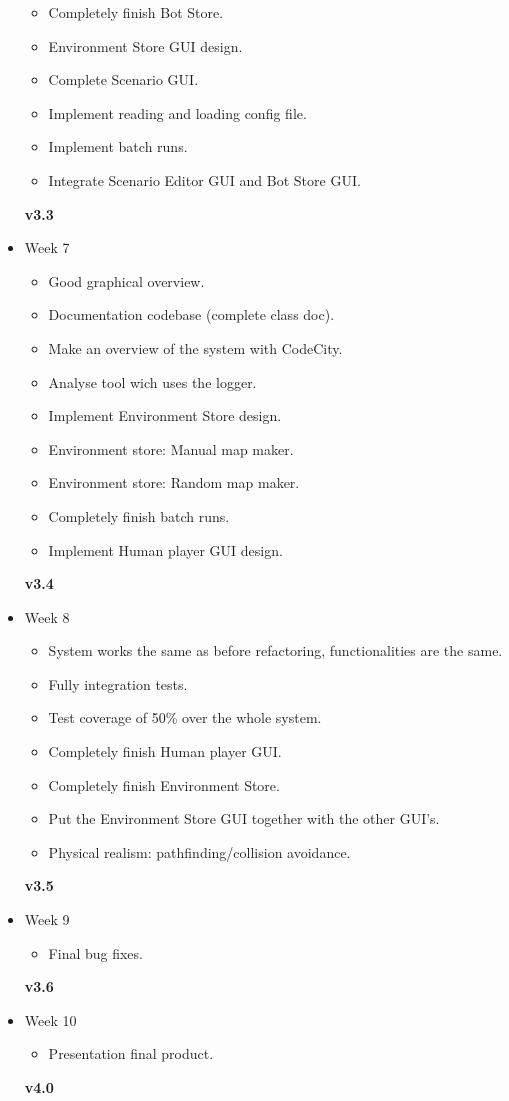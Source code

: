 \begin{itemize}
\begin{itemize}
    \item Completely finish Bot Store.
    \item Environment Store GUI design.
    \item Complete Scenario GUI.
    \item Implement reading and loading config file.
    \item Implement batch runs.
    \item Integrate Scenario Editor GUI and Bot Store GUI.
  \end{itemize}
  \textbf{v3.3}
  \item Week 7
  \begin{itemize}
    \item Good graphical overview.
        \item Documentation codebase (complete class doc).
        \item  Make an overview of the system with CodeCity.
        \item  Analyse tool wich uses the logger. 
    \item Implement Environment Store design.
    \item Environment store: Manual map maker.
    \item Environment store: Random map maker.
    \item Completely finish batch runs.
    \item Implement Human player GUI design.
  \end{itemize}
  \textbf{v3.4}
  \item Week 8
  \begin{itemize}
    \item System works the same as before refactoring, functionalities are the same. 
        \item Fully integration tests.
        \item Test coverage of 50\% over the whole system.
    \item Completely finish Human player GUI.
    \item Completely finish Environment Store.
    \item Put the Environment Store GUI together with the other GUI's.
    \item Physical realism: \gls{pathfinding}/collision avoidance.
  \end{itemize}
  \textbf{v3.5}
  \item Week 9 
  \begin{itemize}
    \item Final bug fixes.
  \end{itemize}
  \textbf{v3.6}
  \item Week 10 
  \begin{itemize}
    \item Presentation final product.
  \end{itemize}
  \textbf{v4.0}
\end{itemize}

